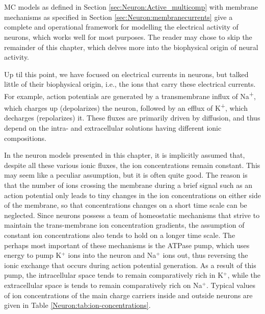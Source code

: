 

\section{}
\label{sec:Neuron:Ions_and_reversals}
MC models as defined in Section \ref{sec:Neuron:Active_multicomp} with membrane mechanisms as specified in Section \ref{sec:Neuron:membranecurrents} give a complete and operational framework for modelling the electrical activity of neurons, which works well for most purposes. The reader may chose to skip the remainder of this chapter, which delves more into the biophysical origin of neural activity. 

Up til this point, we have focused on electrical currents in neurons, but talked little of their biophysical origin, i.e., the ions that carry these electrical currents. For example, action potentials are generated by a transmembrane influx of Na\textsuperscript{+}, which charges up (depolarizes) the neuron, followed by an efflux of K\textsuperscript{+}, which decharges (repolarizes) it. These fluxes are primarily driven by diffusion, and thus depend on the intra- and extracellular solutions having different ionic compositions. 

In the neuron models presented in this chapter, it is implicitly assumed that, despite all these various ionic fluxes, the ion concentrations remain constant. This may seem like a peculiar assumption, but it is often quite good. The reason is that the number of ions crossing the membrane during a brief signal such as an action potential only leads to tiny changes in the ion concentrations on either side of the membrane, so that concentrations changes on a short time scale can be neglected. Since neurons possess a team of homeostatic mechanisms that strive to maintain the trans-membrane ion concentration gradients, the assumption of constant ion concentrations also tends to hold on a longer time scale.  The perhaps most important of these mechanisms is the ATPase pump, which uses energy to pump K$^+$ ions into the neuron and Na$^+$ ions out, thus reversing the ionic exchange that occurs during action potential generation. As a result of this pump, the intracellular space tends to remain comparatively rich in K$^+$, while the extracellular space is tends to remain comparatively rich on Na$^+$. Typical values of ion concentrations of the main charge carriers inside and outside neurons are given in Table \ref{Neuron:tab:ion-concentrations}. 

